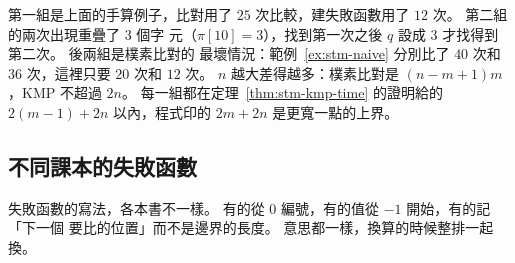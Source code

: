 
第一組是上面的手算例子，比對用了 $25$ 次比較，建失敗函數用了 $12$ 次。 第二組的兩次出現重疊了 $3$ 個字
元（$\pi[10] = 3$），找到第一次之後 $q$ 設成 $3$ 才找得到第二次。 後兩組是樸素比對的
最壞情況：範例~\ref{ex:stm-naive} 分別比了 $40$ 次和 $36$ 次，這裡只要 $20$ 次和
$12$ 次。 $n$ 越大差得越多：樸素比對是 $(n - m + 1)m$，KMP 不超過 $2n$。 每一組都在定理~\ref{thm:stm-kmp-time} 的證明給的 $2(m - 1) + 2n$ 以內，程式印的
$2m + 2n$ 是更寬一點的上界。

\subsection{不同課本的失敗函數}

失敗函數的寫法，各本書不一樣。 有的從 $0$ 編號，有的值從 $-1$ 開始，有的記「下一個
要比的位置」而不是邊界的長度。 意思都一樣，換算的時候整排一起換。

